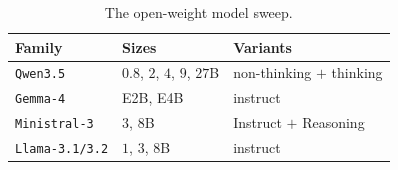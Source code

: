 \begin{table}[ht]
  \centering \small
  \caption{The open-weight model sweep.}
  \label{tab:models}
  \begin{tabular}{@{}lll@{}}
    \toprule
    \textbf{Family} & \textbf{Sizes} & \textbf{Variants} \\
    \midrule
    \texttt{Qwen3.5}       & $0.8$, $2$, $4$, $9$, $27$B & non-thinking $+$ thinking \\
    \texttt{Gemma-4}       & E2B, E4B                    & instruct \\
    \texttt{Ministral-3}   & $3$, $8$B                   & Instruct $+$ Reasoning \\
    \texttt{Llama-3.1/3.2} & $1$, $3$, $8$B              & instruct \\
    \bottomrule
  \end{tabular}
\end{table}
